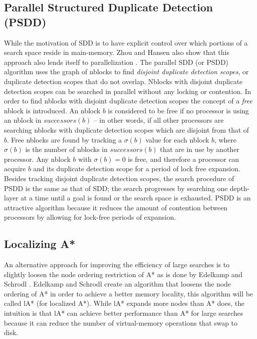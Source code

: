 \documentclass{article} \usepackage{aaai} \usepackage{graphicx}
\begin{document}
\subsection{Parallel Structured Duplicate Detection (PSDD)}

While the motivation of SDD is to have explicit control over which
portions of a search space reside in main-memory.  Zhou and Hansen
also show that this approach also lends itself to parallelization
\cite{zhou:psd}.  The parallel SDD (or PSDD) algorithm uses the graph
of nblocks to find \emph{disjoint duplicate detection scopes}, or
duplicate detection scopes that do not overlap.  Nblocks with disjoint
duplicate detection scopes can be searched in parallel without any
locking or contention.  In order to find nblocks with disjoint
duplicate detection scopes the concept of a \emph{free} nblock is
introduced.  An nblock $b$ is considered to be free if no processor is
using an nblock in $successors(b)$ -- in other words, if all other
processors are searching nblocks with duplicate detection scopes which
are disjoint from that of $b$.  Free nblocks are found by tracking a
$\sigma(b)$ value for each nblock $b$, where $\sigma(b)$ is the number
of nblocks in $successors(b)$ that are in use by another processor.
Any nblock $b$ with $\sigma(b) = 0$ is free, and therefore a processor
can acquire $b$ and its duplicate detection scope for a period of lock
free expansion.  Besides tracking disjoint duplicate detection scopes,
the search procedure of PSDD is the same as that of SDD; the search
progresses by searching one depth-layer at a time until a goal is
found or the search space is exhausted.  PSDD is an attractive
algorithm because it reduces the amount of contention between
processors by allowing for lock-free periods of expansion.

\subsection{Localizing A*}

An alternative approach for improving the efficiency of large searches
is to slightly loosen the node ordering restriction of A* as is done
by Edelkamp and Schrodl \cite{edelkamp:loc}.  Edelkamp and Schrodl
create an algorithm that loosens the node ordering of A* in order to
achieve a better memory locality, this algorithm will be called lA*
(for localized A*).  While lA* expands more nodes than A* does, the
intuition is that lA* can achieve better performance than A* for large
searches because it can reduce the number of virtual-memory operations
that swap to disk.
\end{document}
